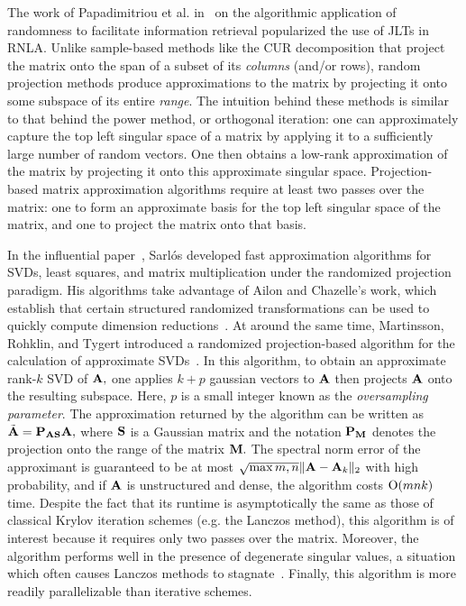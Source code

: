 The work of Papadimitriou et al. in~\cite{PRTV00} on the algorithmic application of
randomness to facilitate information retrieval popularized the use of JLTs in RNLA. 
Unlike sample-based methods like the CUR decomposition that project the matrix onto the span of a
subset of its \emph{columns} (and/or rows), random projection methods produce approximations
to the matrix by projecting it onto some subspace of its entire \emph{range}. The intuition behind
these methods is similar to that behind the power method, or orthogonal iteration:
one can approximately capture the top left singular space of a matrix by applying it to
a sufficiently large number of random vectors. One then obtains a low-rank approximation of the matrix
by projecting it onto this approximate singular space. Projection-based 
matrix approximation algorithms require at least two passes over the matrix: one to form
an approximate basis for the top left singular space of the matrix, and one to 
project the matrix onto that basis.

In the influential paper~\cite{Sar06}, Sarl\'os developed fast approximation algorithms for SVDs, least squares, 
and matrix multiplication under the randomized projection paradigm.
His algorithms take advantage of Ailon and Chazelle's work, which establish
that certain structured randomized transformations can be used to quickly compute
dimension reductions~\cite{AC06}. At around the same time, Martinsson, Rohklin, and Tygert introduced a 
randomized projection-based algorithm for the calculation of approximate SVDs~\cite{MRT06,MRT11}. In this algorithm,
to obtain an approximate rank-$k$ SVD of $\mathbf{A},$ one applies $k+p$ gaussian vectors to $\mathbf{A}$
then projects $\mathbf{A}$ onto the resulting subspace. Here, $p$ is a small integer known as the
\emph{oversampling parameter}. The approximation returned by the algorithm can be written as
$\tilde{\mathbf{A}} = \mathbf{P}_{\mathbf{A} \mathbf{S}} \mathbf{A},$ where $\mathbf{S}$ is a Gaussian matrix and
the notation $\mathbf{P}_{\mathbf{M}}$ denotes the projection
onto the range of the matrix $\mathbf{M}.$ The spectral norm error of the approximant is guaranteed to be at 
most $\sqrt{\max{m , n}}\|\mathbf{A} - \mathbf{A}_k\|_2$ with high
probability, and if $\mathbf{A}$ is unstructured and dense, the algorithm costs $\mathrm{O}(mnk)$ time. 
Despite the fact that its runtime is asymptotically the same as those of classical Krylov iteration
schemes (e.g. the Lanczos method), this algorithm is of interest because it requires only two passes over
the matrix. Moreover, the algorithm performs well in the presence of degenerate singular values,
a situation which often causes Lanczos methods to stagnate~\cite{MRT11}. Finally, this algorithm
is more readily parallelizable than iterative schemes. 

